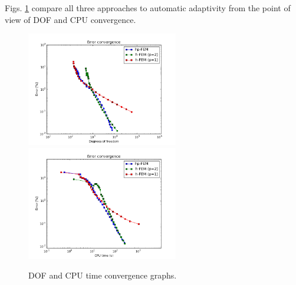 Figs. \ref{fig:nist-5-conv} compare all
three approaches to automatic adaptivity from the point
of view of DOF and CPU convergence.

\begin{figure}[!ht]
\centering
\includegraphics[height=5cm]{nist/nist-5/conv_dof_aniso.png}\ \
\includegraphics[height=5cm]{nist/nist-5/conv_cpu_aniso.png}
\caption{DOF and CPU time convergence graphs.}
\label{fig:nist-5-conv}
\end{figure}

